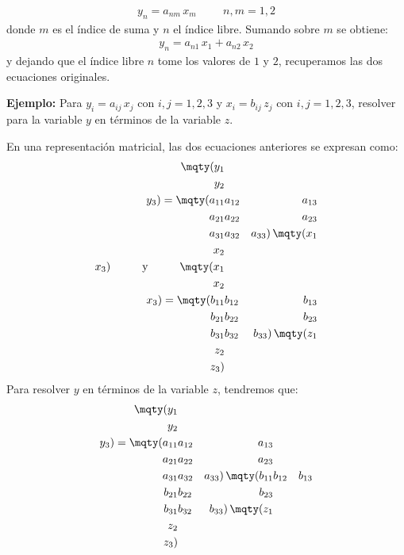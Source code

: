 \begin{align*}
y_{n} = a_{nm} \, x_{m} \hspace{1cm} n, m = 1, 2
\end{align*}
donde $m$ es el índice de suma y $n$ el índice libre. Sumando sobre $m$ se obtiene:
\begin{align*}
y_{n} = a_{n1} \, x_{1} + a_{n2} \, x_{2}
\end{align*}
y dejando que el índice libre $n$ tome los valores de $1$ y $2$, recuperamos las dos ecuaciones originales.
\par
\noindent
\textbf{Ejemplo: } Para $y_{i} = a_{ij} \, x_{j}$ con $i, j = 1, 2, 3$ y $x_{i} = b_{ij} \, z_{j}$ con $i, j = 1, 2, 3$, resolver para la variable $y$ en términos de la variable $z$.
\par
En una representación matricial, las dos ecuaciones anteriores se expresan como:
\begin{align*}
\mqty(y_{1} \\ y_{2} \\ y_{3}) = \mqty(
a_{11} & a_{12} & a_{13} \\
a_{21} & a_{22} & a_{23} \\
a_{31} & a_{32} & a_{33}
) \, \mqty(
x_{1} \\ x_{2} \\ x_{3}
) \hspace{1cm} \mbox{y} \hspace{1cm}
\mqty(x_{1} \\ x_{2} \\ x_{3}) = \mqty(
b_{11} & b_{12} & b_{13} \\
b_{21} & b_{22} & b_{23} \\
b_{31} & b_{32} & b_{33}
) \, \mqty(
z_{1} \\ z_{2} \\ z_{3}
)
\end{align*}
Para resolver $y$ en términos de la variable $z$, tendremos que:
\begin{align*}
\mqty(y_{1} \\ y_{2} \\ y_{3}) = \mqty(
a_{11} & a_{12} & a_{13} \\
a_{21} & a_{22} & a_{23} \\
a_{31} & a_{32} & a_{33}
) \, \mqty(
b_{11} & b_{12} & b_{13} \\
b_{21} & b_{22} & b_{23} \\
b_{31} & b_{32} & b_{33}
) \, \mqty(
z_{1} \\ z_{2} \\ z_{3}
)        
\end{align*}
